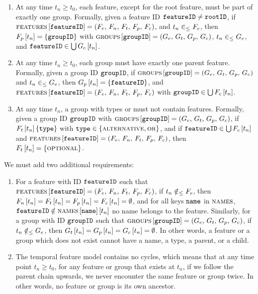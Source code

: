 \begin{enumerate}[\itbf{WF\arabic*}, itemsep=0mm]
   \item At any time $t_n \geq t_0$, each feature, except for the root feature, must be part of exactly one group. Formally, given a feature ID $\texttt{featureID} \neq \texttt{rootID}$, if $\textsc{features} \left[ \texttt{featureID} \right] = \left(F_e,\, F_n,\, F_t,\, F_p,\, F_c\right)$, and $t_n \in_\leq F_e$, then $F_p \left[ t_n \right] = \left\{\texttt{groupID}\right\}$ with $\textsc{groups}{} \left[ \texttt{groupID} \right] = \left(G_e,\, G_t,\, G_p,\, G_c\right)$, $t_n \in_\leq G_e$, and $\texttt{featureID} \in \bigcup G_c \left[ t_n \right]$. 
   \item At any time $t_n \geq t_0$, each group must have exactly one parent feature. Formally, given a group ID $\texttt{groupID}$, if $\textsc{groups}{} \left[ \texttt{groupID} \right] = \left(G_e,\, G_t,\, G_p,\, G_c\right)$ and $t_n \in_\leq G_e$, then $G_p \left[ t_n \right] = \left\{\texttt{featureID}\right\}$, and $\textsc{features} \left[ \texttt{featureID} \right] = \left(F_e,\, F_n,\, F_t,\, F_p,\, F_c\right)$ with $\texttt{groupID} \in \bigcup F_c \left[ t_n \right]$.
   \item At any time $t_n$, a group with types \xortype{} or \ortype{} must not contain \mandatory{} features. Formally, given a group ID $\texttt{groupID}$ with $\textsc{groups}{} \left[ \texttt{groupID} \right] = \left(G_e,\, G_t,\, G_p,\, G_c\right)$, if $F_t \left[ t_n \right] \left\{\texttt{type}\right\}$ with $\texttt{type} \in \left\{\textsc{alternative}{}, \textsc{or}{}\right\}$, and if $\texttt{featureID} \in \bigcup F_c \left[ t_n \right]$ and $\textsc{features} \left[ \texttt{featureID} \right] = \left(F_e,\, F_n,\, F_t,\, F_p,\, F_c\right)$, then $F_t \left[ t_n \right] = \left\{\textsc{optional}\right\}$.
\end{enumerate}

We must add two additional requirements:
\begin{enumerate}[itemsep=0mm]
   \item[\itbf{WF8}] For a feature with ID $\texttt{featureID}$ such that $\textsc{features} \left[ \texttt{featureID} \right] = \left(F_e,\, F_n,\, F_t,\, F_p,\, F_c\right)$, if $t_n \notin_\leq F_e$, then $F_n \left[ t_n \right] = F_t \left[ t_n \right] = F_p \left[ t_n \right] = F_c \left[ t_n \right] = \emptyset$, and for all keys $\texttt{name}$ in $\textsc{names}$, $\texttt{featureID} \notin \textsc{names} \left[ \texttt{name} \right] \left[ t_n \right]$ \textemdash{} no name belongs to the feature. Similarly, for a group with ID $\texttt{groupID}$ such that $\textsc{groups}{} \left[ \texttt{groupID} \right] = \left(G_e,\, G_t,\, G_p,\, G_c\right)$, if $t_n \notin_\leq G_e$, then $G_t \left[ t_n \right] = G_p \left[ t_n \right] = G_c \left[ t_n \right] = \emptyset$. In other words, a feature or a group which does not exist cannot have a name, a type, a parent, or a child.
   \item[\itbf{WF9}] The temporal feature model contains no cycles, which means that at any time point $t_n \geq t_0$, for any feature or group that exists at $t_n$, if we follow the parent chain upwards, we never encounter the same feature or group twice. In other words, no feature or group is its own ancestor.
\end{enumerate}

